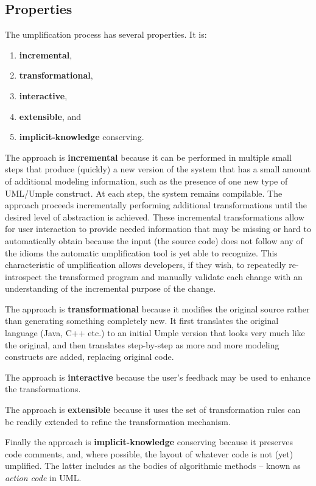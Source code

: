 \subsection{Properties}

The umplification process has several properties. It is:
\begin{enumerate}
 \item \textbf{incremental}, 
 \item \textbf{transformational},
 \item \textbf{interactive},  
 \item \textbf{extensible}, and
 \item \textbf{implicit-knowledge} conserving. 
\end{enumerate}

The approach is \textbf{incremental} because it can be performed in multiple small steps that produce (quickly) a new version of the system that has a small amount of additional modeling information, such as the presence of one new type of UML/Umple construct. At each step, the system remains compilable. The approach proceeds incrementally performing additional transformations until the desired level of abstraction is achieved.	These incremental transformations allow for user interaction to provide needed information that may be missing or hard to automatically obtain because the input (the source code) does not follow any of the idioms the automatic umplification tool is yet able to recognize. This characteristic of umplification allows developers, if they wish, to repeatedly re-introspect the transformed program and manually validate each change with an understanding of the incremental purpose of the change.

The approach is \textbf{transformational} because it modifies the original source rather than generating something completely new. It first translates the original language (Java, C++ etc.) to an initial Umple version that looks very much like the original, and then translates step-by-step as more and more modeling constructs are added, replacing original code.

The approach is \textbf{interactive} because the user's feedback may be used to enhance the transformations.

The approach is \textbf{extensible} because it uses the set of transformation rules can be readily extended to refine the transformation mechanism. 

Finally the approach is \textbf{implicit-knowledge} conserving because it preserves code comments, and, where possible, the layout of whatever code is not (yet) umplified. The latter includes as the bodies of algorithmic methods – known as \textit{action code} in UML.

